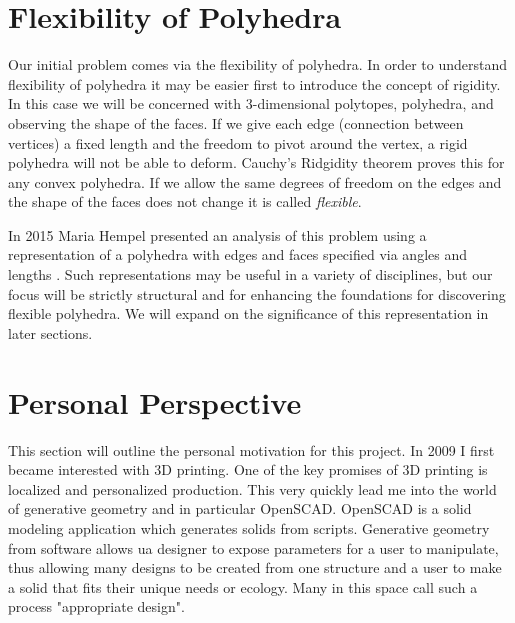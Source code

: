 \section{Flexibility of Polyhedra}

Our initial problem comes via the flexibility of polyhedra. In order to
understand flexibility of polyhedra it may be easier first to introduce the
concept of rigidity. In this case we will be concerned with 3-dimensional
polytopes, polyhedra, and observing the shape of the faces. If we give each
edge (connection between vertices) a fixed length and the freedom to pivot
around the vertex, a rigid polyhedra will not be able to deform. Cauchy's
Ridgidity theorem proves this for any convex polyhedra\cite{Gluck_1975}.
If we allow the same degrees of freedom on the edges and the shape of the
faces does not change it is called \emph{flexible}\cite{Connelly_1977}.

In 2015 Maria Hempel presented an analysis of this problem using a representation
of a polyhedra with edges and faces specified via angles and lengths
\cite{Hempel_2015}.
Such representations may be useful in a variety of disciplines, but our
focus will be strictly structural and for enhancing the foundations for
discovering flexible polyhedra.
We will expand on the significance of this representation in later sections.

\section{Personal Perspective}

This section will outline the personal motivation for this project.
In 2009 I first became interested with 3D printing. One of the
key promises of 3D printing is localized and personalized production.
This very quickly lead me into the world of generative geometry and in
particular OpenSCAD. OpenSCAD is a solid modeling application which
generates solids from scripts. Generative geometry from software allows
ua designer to expose parameters for a user to manipulate, thus allowing
many designs to be created from one structure and a user to make a solid
that fits their unique needs or ecology. Many in this space call
such a process "appropriate design".

